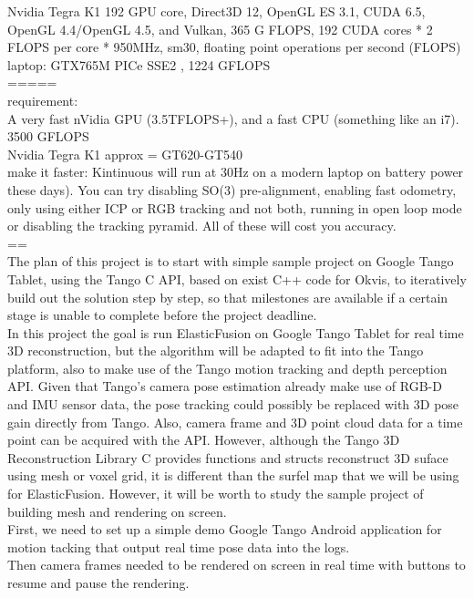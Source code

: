 \documentclass[12pt,twoside]{article}
\begin{document}
Nvidia Tegra K1  192  GPU core, Direct3D 12, OpenGL ES 3.1, CUDA 6.5, OpenGL 4.4/OpenGL 4.5, and Vulkan, 365 G FLOPS, 192 CUDA cores * 2 FLOPS per core * 950MHz, sm30, floating point operations per second (FLOPS)\\
laptop: GTX765M PICe SSE2 , 1224 GFLOPS\\
=====\\
requirement:\\
A very fast nVidia GPU (3.5TFLOPS+), and a fast CPU (something like an i7).  3500 GFLOPS\\
Nvidia Tegra K1  approx = GT620-GT540\\
make it faster: Kintinuous will run at 30Hz on a modern laptop on battery power these days). You can try disabling SO(3) pre-alignment, enabling fast odometry, only using either ICP or RGB tracking and not both, running in open loop mode or disabling the tracking pyramid. All of these will cost you accuracy.\\
==\\
The plan of this project is to start with simple sample project on Google Tango Tablet, using the Tango C API, based on exist C++ code for Okvis\cite{leutenegger2015keyframe}, to iteratively build out the solution step by step, so that milestones are available if a certain stage is unable to complete before the project deadline.\\
In this project the goal is run ElasticFusion\citep{whelan2016elasticfusion} on Google Tango Tablet for real time 3D reconstruction, but the algorithm will be adapted to fit into the Tango platform, also to make use of the Tango motion tracking and depth perception API. Given that Tango's camera pose estimation already make use of RGB-D and IMU sensor data, the pose tracking could possibly be replaced with 3D pose gain directly from Tango. Also, camera frame and 3D point cloud data for a time point can be acquired with the API. However, although the Tango 3D Reconstruction Library C provides functions and structs reconstruct 3D suface using mesh or voxel grid, it is different than the surfel map that we will be using for ElasticFusion\citep{whelan2016elasticfusion}. However, it will be worth to study the sample project of building mesh and rendering on screen.\\
First, we need to set up a simple demo Google Tango Android application for motion tacking that output real time pose data into the logs.\\
Then camera frames needed to be rendered on screen in real time with buttons to resume and pause the rendering.\\
\end{document}
